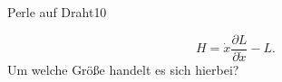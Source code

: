 \begin{exercise}{Perle auf Draht}{10}
\begin{enumerate}
    \begin{equation}
      \label{eqn:Hamilton}
      H = \dot{x}\frac{\partial L}{\partial\dot{x}} - L.
    \end{equation}
    Um welche Grö\ss e handelt es sich hierbei?
    \end{enumerate}
\end{exercise}
